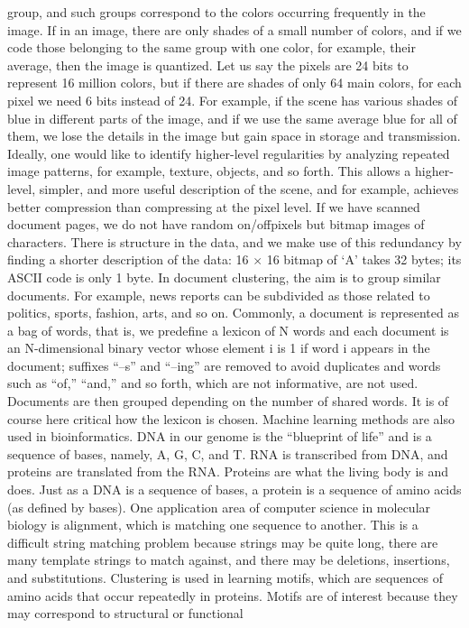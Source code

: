 group, and such groups correspond to the colors occurring frequently in the image. If in an image, there are only shades of a small number of colors, and if we code those belonging to the same group with one color, for example, their average, then the image is quantized. Let us say the pixels are 24 bits to represent 16 million colors, but if there are shades of only 64 main colors, for each pixel we need 6 bits instead of 24. For example, if the scene has various shades of blue in different parts of the image, and if we use the same average blue for all of them, we lose the details in the image but gain space in storage and transmission. Ideally, one would like to identify higher-level regularities by analyzing repeated image patterns, for example, texture, objects, and so forth. This allows a higher-level, simpler, and more useful description of the scene, and for example, achieves better compression than compressing at the pixel level. If we have scanned document pages, we do not have random on/offpixels but bitmap images of characters. There is structure in the data, and we make use of this redundancy by finding a shorter description of the data: 16 $\times$ 16 bitmap of ‘A’ takes 32 bytes; its ASCII code is only 1 byte. In document clustering, the aim is to group similar documents. For example, news reports can be subdivided as those related to politics, sports, fashion, arts, and so on. Commonly, a document is represented as a bag of words, that is, we predefine a lexicon of N words and each document is an N-dimensional binary vector whose element i is 1 if word i appears in the document; suffixes “--s” and “--ing” are removed to avoid duplicates and words such as “of,” “and,” and so forth, which are not informative, are not used. Documents are then grouped depending on the number of shared words. It is of course here critical how the lexicon is chosen. Machine learning methods are also used in bioinformatics. DNA in our genome is the “blueprint of life” and is a sequence of bases, namely, A, G, C, and T. RNA is transcribed from DNA, and proteins are translated from the RNA. Proteins are what the living body is and does. Just as a DNA is a sequence of bases, a protein is a sequence of amino acids (as defined by bases). One application area of computer science in molecular biology is alignment, which is matching one sequence to another. This is a difficult string matching problem because strings may be quite long, there are many template strings to match against, and there may be deletions, insertions, and substitutions. Clustering is used in learning motifs, which are sequences of amino acids that occur repeatedly in proteins. Motifs are of interest because they may correspond to structural or functional

